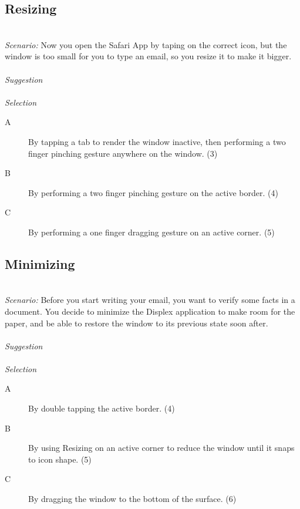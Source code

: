 \documentclass[11pt]{amsart}
\begin{document}

\subsection{Resizing}
\hfill\\
\emph{Scenario:}
Now you open the Safari App by taping on the correct icon, but the window is too small for you to type an email, so you resize it to make it bigger.
\\\\
\emph{Suggestion}
\\\\
\emph{Selection}
\begin{description}
\item[A]{By tapping a tab to render the window inactive, then performing a two finger pinching gesture anywhere on the window. (3)}
\item[B]{By performing a two finger pinching gesture on the active border. (4)}
\item[C]{By performing a one finger dragging gesture on an active corner. (5)}
\end{description}



\subsection{Minimizing}
\hfill\\
\emph{Scenario:}
Before you start writing your email, you want to verify some facts in a document.
You decide to minimize the Displex application to make room for the paper, and be able to restore the window to its previous state soon after.
\\\\
\emph{Suggestion}
\\\\
\emph{Selection}
\begin{description}
\item[A]{By double tapping the active border. (4)}
\item[B]{By using Resizing on an active corner to reduce the window until it snaps to icon shape. (5)}
\item[C]{By dragging the window to the bottom of the surface. (6)}
\end{description}

\end{document}

